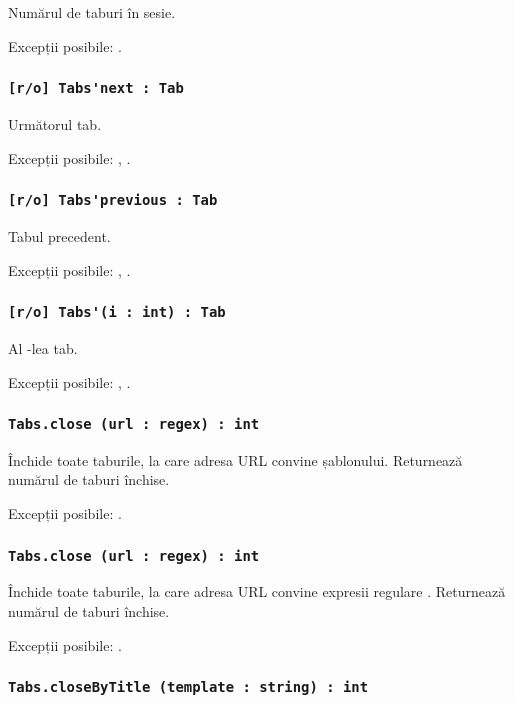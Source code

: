 Numărul de taburi în sesie.

Excepții posibile: .

\subsubsection{\lstinline|[r/o] Tabs'next : Tab|}

Următorul tab.

Excepții posibile: , .

\subsubsection{\lstinline|[r/o] Tabs'previous : Tab|}

Tabul precedent.

Excepții posibile: , .

\subsubsection{\lstinline|[r/o] Tabs'(i : int) : Tab|}

Al -lea tab.

Excepții posibile: , .

\subsubsection{\lstinline|Tabs.close (url : regex) : int|}

Închide toate taburile, la care adresa URL convine șablonului. Returnează numărul de taburi închise.

Excepții posibile: .

\subsubsection{\lstinline|Tabs.close (url : regex) : int|}

Închide toate taburile, la care adresa URL convine expresii regulare . Returnează numărul de taburi închise.

Excepții posibile: .

\subsubsection{\lstinline|Tabs.closeByTitle (template : string) : int|}

